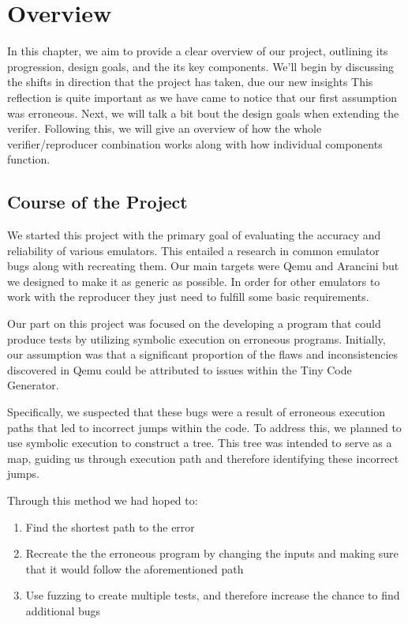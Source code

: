 
\chapter{Overview}\label{chapter:overview}
In this chapter, we aim to provide a clear overview of our project, outlining its progression, design goals, and the its key components.
We'll begin by discussing the shifts in direction that the project has taken, due our new insights
This reflection is quite important as we have came to notice that our first assumption was erroneous.
Next, we will talk a bit bout the design goals when extending the verifer.
Following this, we will give an overview of how the whole verifier/reproducer combination works along with how individual components function.

\section{Course of the Project}
We started this project with the primary goal of evaluating the accuracy and reliability of various emulators.
This entailed a research in common emulator bugs along with recreating them.
Our main targets were Qemu and Arancini but we designed to make it as generic as possible.
In order for other emulators to work with the reproducer they just need to fulfill some basic requirements.

Our part on this project was focused on the developing a program that could produce tests by utilizing symbolic execution on erroneous programs.
Initially, our assumption was that a significant proportion of the flaws and inconsistencies discovered in Qemu could be attributed to issues within the Tiny Code Generator.

Specifically, we suspected that these bugs were a result of erroneous execution paths that led to incorrect jumps within the code. To address this, we planned to use symbolic execution to construct a tree.
This tree was intended to serve as a map, guiding us through execution path and therefore identifying these incorrect jumps.

Through this method we had hoped to:
\begin{enumerate}[label=(\Alph*)]
   \item Find the shortest path to the error
   \item Recreate the the erroneous program by changing the inputs and making sure that it would follow the aforementioned path
   \item Use fuzzing to create multiple tests, and therefore increase the chance to find additional bugs
\end{enumerate}

